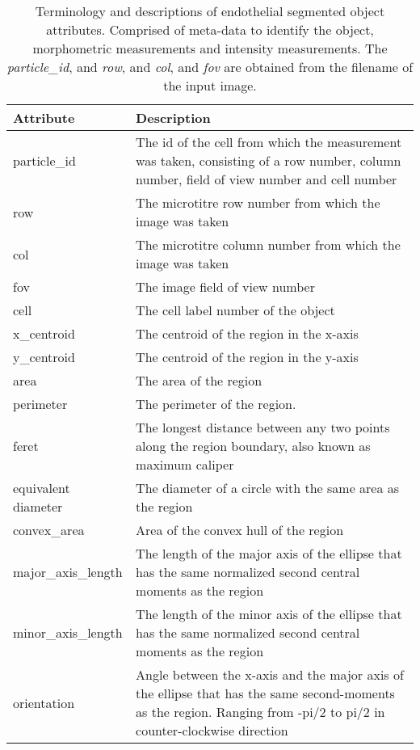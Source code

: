 \begin{table}[htbp]
\caption[Endothelial morphometry segmented region attributes and properties]{Terminology and descriptions of endothelial segmented object attributes. Comprised of meta-data to identify the object, morphometric measurements and intensity measurements. The \emph{particle\_id}, and \emph{row}, and \emph{col}, and \emph{fov} are obtained from the filename of the input image.}
\centering
\label{table:endothelial_morphometry:region_properties}
\begin{tabular}{p{4cm} p{10cm}}
    \toprule
    Attribute  & Description \\
    \midrule
    particle\_id        & The id of the cell from which the measurement was taken, consisting of a row number, column number, field of view number and cell number \\
    row                 & The microtitre row number from which the image was taken \\
    col                 & The microtitre column number from which the image was taken \\
    fov                 & The image field of view number \\
    cell                & The cell label number of the object \\
    x\_centroid         & The centroid of the region in the x-axis \\
    y\_centroid         & The centroid of the region in the y-axis \\
    area                & The area of the region \\
    perimeter           & The perimeter of the region. \\
    feret               & The longest distance between any two points along the region boundary, also known as maximum caliper \\
    equivalent diameter & The diameter of a circle with the same area as the region \\
    convex\_area        & Area of the convex hull of the region \\
    major\_axis\_length & The length of the major axis of the ellipse that has the same normalized second central moments as the region \\
    minor\_axis\_length & The length of the minor axis of the ellipse that has the same normalized second central moments as the region \\
    orientation         & Angle between the x-axis and the major axis of the ellipse that has the same second-moments as the region. Ranging from -pi/2 to pi/2 in counter-clockwise direction \\

\end{tabular}
\end{table}
